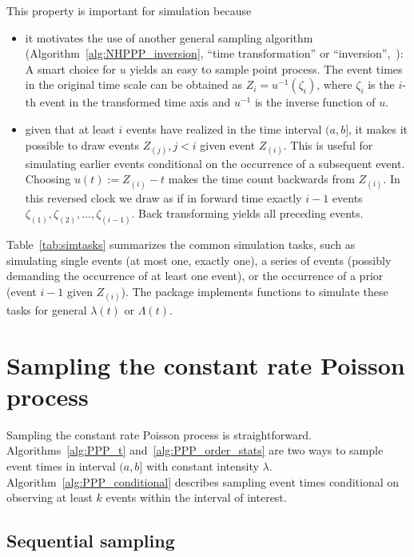 \documentclass[article,nojss]{jss}\usepackage[]{graphicx}\usepackage[]{xcolor}
\begin{document}
This property is important for simulation because
\begin{itemize}
    \item it motivates the use of another general sampling algorithm (Algorithm~\ref{alg:NHPPP_inversion}, ``time transformation'' or ``inversion'',~\citet{Cinlar1975inversion}): A smart choice for $u$ yields an easy to sample point process. The event times in the original time scale can be obtained as $Z_i = u^{-1}(\zeta_i)$, where $\zeta_i$ is the $i$-th event in the transformed time axis and $u^{-1}$ is the inverse function of $u$.
    \item given that at least $i$ events have realized in the time interval $(a, b]$, it makes it possible to draw events ${Z_{(j)}, j<i}$ given event $Z_{(i)}$. This is useful for simulating earlier events conditional on the occurrence of a subsequent event. Choosing $u(t) := Z_{(i)} - t$ makes the time count backwards from $Z_{(i)}$. In this reversed clock we draw as if in forward time exactly $i-1$ events $\zeta_{(1)}, \zeta_{(2)}, \dots, \zeta_{(i-1)}$. Back transforming yields all preceding events.
\end{itemize}

Table~\ref{tab:simtasks} summarizes the common simulation tasks, such as simulating single events (at most one, exactly one), a series of events (possibly demanding the occurrence of at least one event), or the occurrence of a prior (event $i-1$ given $Z_{(i)}$). The  package implements functions to simulate these tasks for general $\lambda(t)$ or $\Lambda(t)$.



\section{Sampling the constant rate Poisson process}\label{sec:sample-ppp}

Sampling the constant rate Poisson process is straightforward. Algorithms~\ref{alg:PPP_t} and~\ref{alg:PPP_order_stats} are two ways to sample event times in interval $(a, b]$ with constant intensity $\lambda$. Algorithm~\ref{alg:PPP_conditional} describes sampling event times conditional on observing at least $k$ events within the interval of interest.


\subsection{Sequential sampling}\label{sec:PPP_t}
\end{document}
